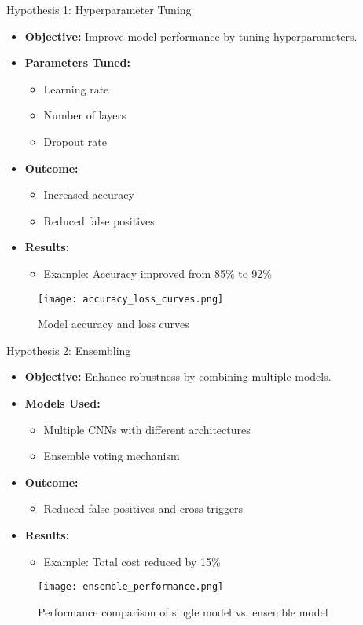 \documentclass{beamer}
\begin{document}
\begin{frame}{Hypothesis 1: Hyperparameter Tuning}
  \begin{itemize}
    \item \textbf{Objective:} Improve model performance by tuning hyperparameters.
    \item \textbf{Parameters Tuned:}
      \begin{itemize}
        \item Learning rate
        \item Number of layers
        \item Dropout rate
      \end{itemize}
    \item \textbf{Outcome:}
      \begin{itemize}
        \item Increased accuracy
        \item Reduced false positives
      \end{itemize}
    \item \textbf{Results:}
      \begin{itemize}
        \item Example: Accuracy improved from 85\% to 92\%
      \end{itemize}
  \end{itemize}
    \begin{figure}
    \texttt{[image: accuracy\_loss\_curves.png]}
    \caption{Model accuracy and loss curves}
  \end{figure}
\end{frame}

\begin{frame}{Hypothesis 2: Ensembling}
  \begin{itemize}
    \item \textbf{Objective:} Enhance robustness by combining multiple models.
    \item \textbf{Models Used:}
      \begin{itemize}
        \item Multiple CNNs with different architectures
        \item Ensemble voting mechanism
      \end{itemize}
    \item \textbf{Outcome:}
      \begin{itemize}
        \item Reduced false positives and cross-triggers
      \end{itemize}
    \item \textbf{Results:}
      \begin{itemize}
        \item Example: Total cost reduced by 15\%
      \end{itemize}
  \end{itemize}
    \begin{figure}
    \texttt{[image: ensemble\_performance.png]}
    \caption{Performance comparison of single model vs. ensemble model}
  \end{figure}
\end{frame}
\end{document}
